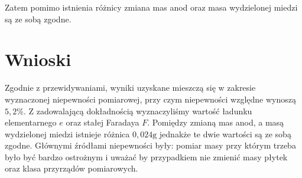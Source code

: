 \documentclass{fizykalab}
\newcommand{\g}{\ensuremath{\text{g}}}
\begin{document}
Zatem pomimo istnienia różnicy zmiana mas anod oraz masa wydzielonej miedzi są ze sobą zgodne.

\section{Wnioski}
Zgodnie z przewidywaniami, wyniki uzyskane mieszczą się w zakresie wyznaczonej niepewności pomiarowej, przy czym niepewności względne wynoszą $5,2\%$.
Z zadowalającą dokładnością wyznaczyliśmy wartość 
ładunku elementarnego $e$ oraz
stałej Faradaya $F$.
Pomiędzy zmianą mas anod, a masą wydzielonej miedzi istnieje różnica $0,024 \g$ 
jednakże te dwie wartości są ze sobą zgodne.
Głównymi źródłami niepewności były: pomiar masy przy którym trzeba było być bardzo
ostrożnym i uważać by przypadkiem nie zmienić masy płytek oraz 
klasa przyrządów pomiarowych.
\end{document}
